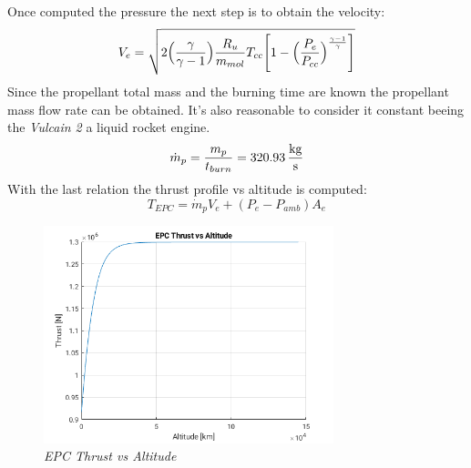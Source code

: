 \documentclass[12pt,fleqn,openany]{book} %
\begin{document}
Once computed the pressure the next step is to obtain the velocity:
\begin{equation}
 V_e=\sqrt{2\Bigl(\frac{\gamma}{\gamma-1}\Bigr)\frac{R_u}{m_{mol}}T_{cc}\Biggl[1-\Bigl(\frac{P_e}{P_{cc}}\Bigr)^{\frac{\gamma-1}{\gamma}}\Biggr]}
\end{equation}
Since the propellant total mass and the burning time are known the propellant mass flow rate can be obtained. It's also reasonable to consider it constant beeing the \textit{Vulcain 2} a liquid rocket engine.
\begin{equation}
 \dot{m}_p = \frac{m_p}{t_{burn}}=\SI{320.93}{\kilogram\over\second}
\end{equation}
With the last relation the thrust profile vs altitude is computed:
\begin{equation}
 T_{EPC}=\dot{m}_pV_e+(P_e-P_{amb})A_e
\end{equation}
\begin{figure}[h]
 \centering
 \includegraphics[width=0.75\textwidth]{EPC_T}
 \caption{\emph{EPC Thrust vs Altitude}}
\end{figure}
\end{document}

